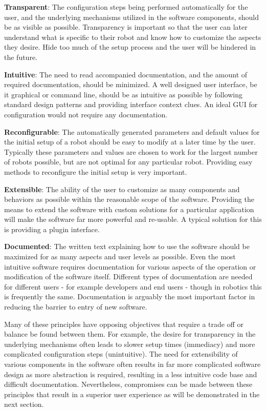\documentclass[10pt,journal,compsoc]{joser1}
\begin{document}
{{\bf Transparent}: The configuration steps being performed automatically for the user, and the underlying mechanisms utilized in the software components, should be as visible as possible. Transparency is important so that the user can later understand what is specific to their robot and know how to customize the aspects they desire. Hide too much of the setup process and the user will be hindered in the future.

{\bf Intuitive}: The need to read accompanied documentation, and the amount of required documentation, should be minimized. A well designed user interface, be it graphical or command line, should be as intuitive as possible by following standard design patterns and providing interface context clues. An ideal GUI for configuration would not require any documentation.

{\bf Reconfigurable}: The automatically generated parameters and default values for the initial setup of a robot should be easy to modify at a later time by the user. Typically these parameters and values are chosen to work for the largest number of robots possible, but are not optimal for any particular robot. Providing easy methods to reconfigure the initial setup is very important. 

{\bf Extensible}: The ability of the user to customize as many components and behaviors as possible within the reasonable scope of the software. Providing the means to extend the software with custom solutions for a particular application will make the software far more powerful and re-usable. A typical solution for this is providing a plugin interface.

{\bf Documented}: The written text explaining how to use the software should be maximized for as many aspects and user levels as possible. Even the most intuitive software requires documentation for various aspects of the operation or modification of the software itself. Different types of documentation are needed for different users - for example developers and end users - though in robotics this is frequently the same. Documentation is arguably the most important factor in reducing the barrier to entry of new software.

Many of these principles have opposing objectives that require a trade off or balance be found between them. For example, the desire for transparency in the underlying mechanisms often leads to slower setup times (immediacy) and more complicated configuration steps (unintuitive). The need for extensibility of various components in the software often results in far more complicated software design as more abstraction is required, resulting in a less intuitive code base and difficult documentation. Nevertheless, compromises can be made between these principles that result in a superior user experience as will be demonstrated in the next section.

}
\end{document}
